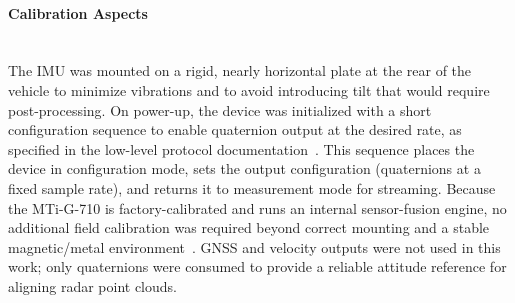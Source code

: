 \paragraph{Calibration Aspects}
\hfill
\\
The IMU was mounted on a rigid, nearly horizontal plate at the rear of the vehicle to minimize vibrations and to avoid introducing tilt that would require post-processing.  
On power-up, the device was initialized with a short configuration sequence to enable quaternion output at the desired rate, as specified in the low-level protocol documentation~\cite{mti_lowlevel_doc}.  
This sequence places the device in configuration mode, sets the output configuration (quaternions at a fixed sample rate), and returns it to measurement mode for streaming.  
Because the MTi-G-710 is factory-calibrated and runs an internal sensor-fusion engine, no additional field calibration was required beyond correct mounting and a stable magnetic/metal environment~\cite{mti710_manual}.  
GNSS and velocity outputs were not used in this work; only quaternions were consumed to provide a reliable attitude reference for aligning radar point clouds.  
